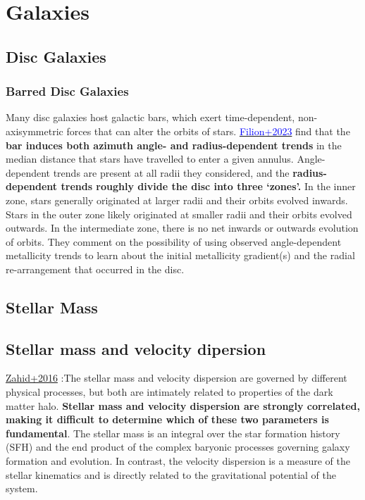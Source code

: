 \chapter{Galaxies}

\section{Disc Galaxies}

\subsection{Barred Disc Galaxies}

Many disc galaxies host galactic bars, which exert time-dependent, non-axisymmetric forces that can alter the orbits of stars. \href{https://ui.adsabs.harvard.edu/abs/2023arXiv230201307F/abstract}{\textcolor{blue}{Filion+2023}}  find that the \textbf{bar induces both azimuth angle- and radius-dependent trends} in the median distance that stars have travelled to enter a given annulus. Angle-dependent trends are present at all radii they considered, and the \textbf{radius-dependent trends roughly divide the disc into three ‘zones’.} In the inner zone, stars generally originated
at larger radii and their orbits evolved inwards. Stars in the outer zone likely originated at smaller radii and their orbits evolved outwards. In the intermediate zone, there is no net inwards or outwards evolution of orbits. They comment on the possibility of using observed angle-dependent metallicity trends to learn about the initial metallicity gradient(s) and the radial re-arrangement that occurred in the disc.


\section{Stellar Mass}


\section{Stellar mass and velocity dipersion}
\href{https://iopscience.iop.org/article/10.3847/0004-637X/832/2/203/pdf}{Zahid+2016} :The stellar mass and velocity dispersion are governed by different physical processes, but both are intimately related to properties of the dark matter halo. \textbf{Stellar mass and velocity dispersion are strongly correlated, making it difficult to determine which of these two parameters is fundamental}. The stellar mass is an integral over the star formation history (SFH) and the end product of the complex baryonic processes governing galaxy formation and evolution. In contrast, the velocity dispersion is a measure of the stellar kinematics and is directly related to the gravitational potential of the system.



